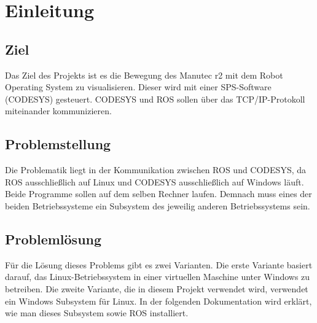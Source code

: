 \section{Einleitung}

\subsection{Ziel}
Das Ziel des Projekts ist es die Bewegung des Manutec r2 mit dem Robot Operating System zu visualisieren. Dieser wird mit einer SPS-Software (CODESYS) gesteuert. CODESYS und ROS sollen über das TCP/IP-Protokoll miteinander kommunizieren. 

\subsection{Problemstellung}
Die Problematik liegt in der Kommunikation zwischen ROS und CODESYS, da ROS ausschließlich auf Linux und CODESYS ausschließlich auf Windows läuft. Beide Programme sollen auf dem selben Rechner laufen. Demnach muss eines der beiden Betriebssysteme ein Subsystem des jeweilig anderen Betriebssystems sein.

\subsection{Problemlösung}
Für die Lösung dieses Problems gibt es zwei Varianten. Die erste Variante basiert darauf, das Linux-Betriebssystem in einer virtuellen Maschine unter Windows zu betreiben. Die zweite Variante, die in diesem Projekt verwendet wird, verwendet ein Windows Subsystem für Linux. In der folgenden Dokumentation wird erklärt, wie man dieses Subsystem sowie ROS installiert.